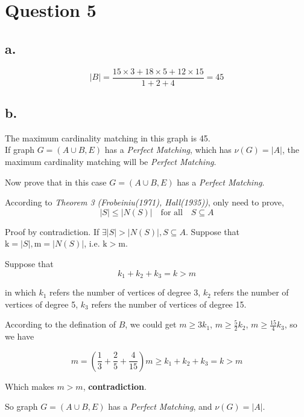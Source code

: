 \documentclass{article}
\begin{document}
\section*{Question 5}{
    \subsection*{a.}{
        \[\lvert \mathit{B} \rvert = \mathrm{\frac{15 \times 3 + 18 \times 5 + 12 \times 15}{1+2+4} = 45}\]
    }
    \subsection*{b.}{
        The maximum cardinality matching in this graph is 45. \\

        If graph \( \mathit{G} = (\mathit{A} \cup \mathit{B}, \mathit{E})\) has a \textit{Perfect Matching}, which has \(\nu (\mathit{G}) = \lvert \mathit{A} \rvert\), the maximum cardinality matching will be \textit{Perfect Matching}. 

        Now prove that in this case \( \mathit{G} = (\mathit{A} \cup \mathit{B}, \mathit{E})\) has a \textit{Perfect Matching}.

        According to \textit{Theorem 3 (Frobeiniu(1971), Hall(1935))}, only need to prove, 
        \[\lvert \mathit{S} \rvert \leqslant \lvert \mathit{N(S)} \rvert \quad \text{for all} \quad \mathit{S} \subseteq \mathit{A}\]

        Proof by contradiction. If \(\exists \lvert \mathit{S} \rvert > \lvert \mathit{N(S)} \rvert, \mathit{S} \subseteq \mathit{A}\). Suppose that \(\mathrm{k} = \lvert \mathit{S} \rvert, \mathrm{m} = \lvert \mathit{N(S)} \rvert\), i.e. \(\mathrm{k} > \mathrm{m}\). 

        Suppose that \[\mathit{k}_{\mathrm{1}} + \mathit{k}_{\mathrm{2}} + \mathit{k}_{\mathrm{3}} = \mathit{k} > \mathit{m}\]

        in which \(\mathit{k}_{\mathrm{1}}\) refers the number of vertices of degree 3, \(\mathit{k}_{\mathrm{2}}\) refers the number of vertices of degree 5, \(\mathit{k}_{\mathrm{3}}\) refers the number of vertices of degree 15.

        According to the defination of \(\mathit{B}\), we could get \(\mathit{m} \geqslant \mathrm{3}\mathit{k}_{\mathrm{1}}\), \(\mathit{m} \geqslant \mathrm{\frac{5}{2}}\mathit{k}_{\mathrm{2}}\), \(\mathit{m} \geqslant \mathrm{\frac{15}{4}}\mathit{k}_{\mathrm{3}}\), so we have 

        \[\mathit{m} = \mathrm{(\frac{1}{3} + \frac{2}{5} + \frac{4}{15})}\mathit{m} \geqslant \mathit{k}_{\mathrm{1}} + \mathit{k}_{\mathrm{2}} + \mathit{k}_{\mathrm{3}} = \mathit{k} > \mathit{m}\]

        Which makes \(\mathit{m} > \mathit{m}\), \textbf{contradiction}.

        So graph \( \mathit{G} = (\mathit{A} \cup \mathit{B}, \mathit{E})\) has a \textit{Perfect Matching}, and \(\nu (\mathit{G}) = \lvert \mathit{A} \rvert\).
    }
}
\end{document}
